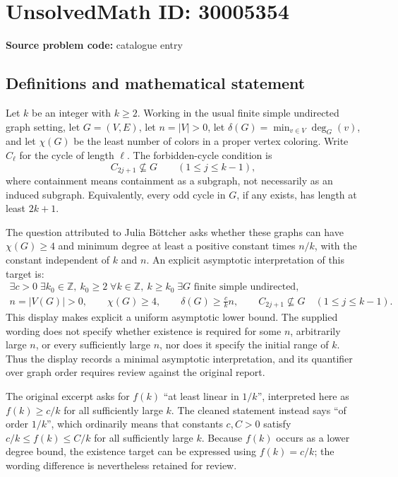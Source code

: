 \documentclass[11pt]{article}
\newcommand{\Z}{\mathbb{Z}}
\begin{document}
\section*{UnsolvedMath ID: 30005354}
\textbf{Source problem code:} catalogue entry
\subsection{Definitions and mathematical statement}
Let \(k\) be an integer with \(k\ge 2\). Working in the usual finite simple undirected graph setting, let \(G=(V,E)\), let \(n=|V|>0\), let \(\delta(G)=\min_{v\in V}\deg_G(v)\), and let \(\chi(G)\) be the least number of colors in a proper vertex coloring. Write \(C_\ell\) for the cycle of length \(\ell\). The forbidden-cycle condition is
\[
C_{2j+1}\not\subseteq G\qquad(1\le j\le k-1),
\]
where containment means containment as a subgraph, not necessarily as an induced subgraph. Equivalently, every odd cycle in \(G\), if any exists, has length at least \(2k+1\).

The question attributed to Julia B\"ottcher asks whether these graphs can have \(\chi(G)\ge4\) and minimum degree at least a positive constant times \(n/k\), with the constant independent of \(k\) and \(n\). An explicit asymptotic interpretation of this target is:
\[
\begin{gathered}
\exists c>0\;\exists k_0\in\Z,\ k_0\ge2\;\forall k\in\Z,\ k\ge k_0\;\exists G\text{ finite simple undirected},\\
n=|V(G)|>0,\qquad
\chi(G)\ge4,\qquad
\delta(G)\ge\frac{c}{k}n,\qquad
C_{2j+1}\not\subseteq G\quad(1\le j\le k-1).
\end{gathered}
\]
This display makes explicit a uniform asymptotic lower bound. The supplied wording does not specify whether existence is required for some \(n\), arbitrarily large \(n\), or every sufficiently large \(n\), nor does it specify the initial range of \(k\). Thus the display records a minimal asymptotic interpretation, and its quantifier over graph order requires review against the original report.

The original excerpt asks for \(f(k)\) ``at least linear in \(1/k\)'', interpreted here as \(f(k)\ge c/k\) for all sufficiently large \(k\). The cleaned statement instead says ``of order \(1/k\)'', which ordinarily means that constants \(c,C>0\) satisfy \(c/k\le f(k)\le C/k\) for all sufficiently large \(k\). Because \(f(k)\) occurs as a lower degree bound, the existence target can be expressed using \(f(k)=c/k\); the wording difference is nevertheless retained for review.
\end{document}
